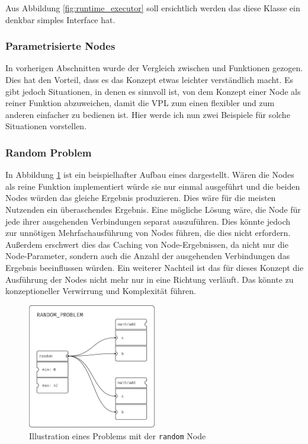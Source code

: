 \documentclass[ngerman]{article}
\begin{document}
Aus Abbildung \ref{fig:runtime_executor} soll ersichtlich werden das diese Klasse ein denkbar simples Interface hat. 

\subsubsection{Parametrisierte Nodes}
\label{sec:parameter_nodes}
In vorherigen Abschnitten wurde der Vergleich zwischen  und Funktionen gezogen. Dies hat den Vorteil, dass es das Konzept etwas leichter verständlich macht.
Es gibt jedoch Situationen, in denen es sinnvoll ist, von dem Konzept einer Node als reiner Funktion abzuweichen, damit die VPL zum einen flexibler und zum anderen einfacher zu bedienen ist. Hier werde ich nun zwei Beispiele für solche Situationen vorstellen.
\subsubsection*{Random Problem}
In Abbildung \ref{fig:random_problem} ist ein beispielhafter Aufbau eines  dargestellt. Wären die  Nodes als reine Funktion implementiert würde sie nur einmal ausgeführt und die beiden  Nodes würden das gleiche Ergebnis produzieren. Dies wäre für die meisten Nutzenden ein überaschendes Ergebnis.
\br
Eine mögliche Lösung wäre, die  Node für jede ihrer ausgehenden Verbindungen separat auszuführen. 
Dies könnte jedoch zur unnötigen Mehrfachausführung von Nodes führen, die dies nicht erfordern.
Außerdem erschwert dies das Caching von Node-Ergebnissen, da nicht nur die Node-Parameter, sondern auch die Anzahl der ausgehenden Verbindungen das Ergebnis beeinflussen würden.
\br
Ein weiterer Nachteil ist das für dieses Konzept die Ausführung der Nodes nicht mehr nur in eine Richtung verläuft. Das könnte zu konzeptioneller Verwirrung und Komplexität führen.
\br
\begin{figure}[htbp]
  \centering
  \includegraphics[width=0.5\textwidth]{graphics/RANDOM_PROBLEM.pdf}
  \caption{Illustration eines Problems mit der \texttt{random} Node}
  \label{fig:random_problem}
\end{figure}
\end{document}
